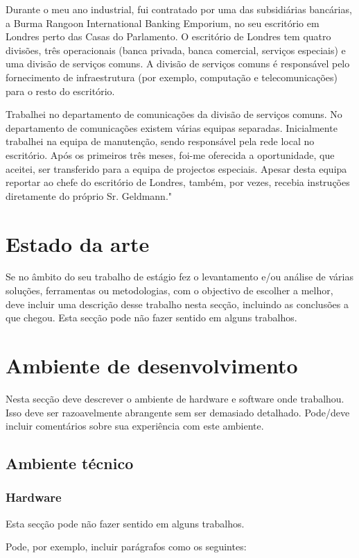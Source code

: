 \documentclass{article}
\begin{document}
Durante o meu ano industrial, fui contratado por uma das subsidiárias bancárias, a Burma Rangoon International Banking Emporium, no seu escritório em Londres perto das Casas do Parlamento. O escritório de Londres tem quatro divisões, três operacionais (banca privada, banca comercial, serviços especiais) e uma divisão de serviços comuns. A divisão de serviços comuns é responsável pelo fornecimento de infraestrutura (por exemplo, computação e telecomunicações) para o resto do escritório. 

Trabalhei no departamento de comunicações da divisão de serviços comuns. No departamento de comunicações existem várias equipas separadas. Inicialmente trabalhei na equipa de manutenção, sendo responsável pela rede local no escritório. Após os primeiros três meses, foi-me oferecida a oportunidade, que aceitei, ser transferido  para a equipa de projectos especiais. Apesar desta equipa reportar ao chefe do escritório de Londres, também, por vezes, recebia instruções diretamente do próprio Sr. Geldmann."


\cleardoublepage
\section{Estado da arte}
Se no âmbito do seu trabalho de estágio fez o levantamento e/ou análise de várias soluções, ferramentas ou metodologias, com o objectivo de escolher a melhor, deve incluir uma descrição desse trabalho nesta secção, incluindo as conclusões a que chegou.
Esta secção pode não fazer sentido em alguns trabalhos.


\cleardoublepage
\section{Ambiente de desenvolvimento}
Nesta secção deve descrever o ambiente de hardware e software onde trabalhou. Isso deve ser razoavelmente abrangente sem ser demasiado detalhado. Pode/deve incluir comentários sobre sua experiência com este ambiente.

\subsection{Ambiente técnico}
\subsubsection{Hardware}
Esta secção pode não fazer sentido em alguns trabalhos.

Pode, por exemplo, incluir parágrafos como os seguintes:
\end{document}
